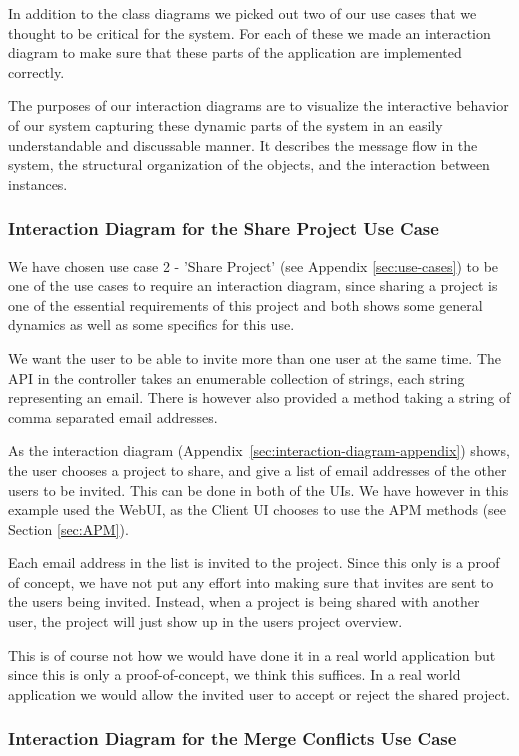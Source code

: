In addition to the class diagrams we picked out two of our use cases that we thought to be critical for the system. For each of these we made an interaction diagram
to make sure that these parts of the application are implemented correctly. 

The purposes of our interaction diagrams are to visualize the interactive behavior of our system capturing these dynamic parts of 
the system in an easily understandable and discussable manner. It describes the message flow in the system, the structural organization
of the objects, and the interaction between instances.

\subsubsection{Interaction Diagram for the Share Project Use Case}

We have chosen use case 2 - 'Share Project' (see Appendix \ref{sec:use-cases}) to be one of the use cases to require an interaction diagram, since sharing a project is one of the essential
requirements of this project and both shows some general dynamics as well as some specifics for this use.

We want the user to be able to invite more than one user at the same time. The API in the controller takes an enumerable collection of strings, each string
representing an email. There is however also provided a method taking a string of comma separated email addresses.

As the interaction diagram (Appendix~\ref{sec:interaction-diagram-appendix}) shows, the user chooses a project to share, and give a list of email
addresses of the other users to be invited. This can be done in both of the UIs. We have however in this example used the WebUI, as the Client UI
chooses to use the APM methods (see Section \ref{sec:APM}). 

Each email address in the list is invited to the project. Since this only is a proof of concept, we have not put any effort into making sure that invites 
are sent to the users being invited. Instead, when a project is being shared with another user, the project will just show up in the users project overview.

This is of course not how we would have done it in a real world application but since this is only a proof-of-concept, we think this suffices. In a 
real world application we would allow the invited user to accept or reject the shared project.

\subsubsection{Interaction Diagram for the Merge Conflicts Use Case}

